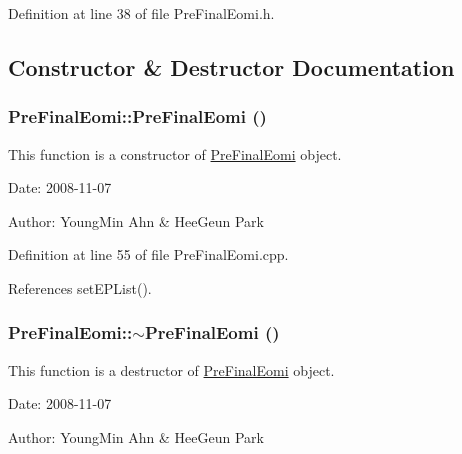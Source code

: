 Definition at line 38 of file PreFinalEomi.h.

\subsection{Constructor \& Destructor Documentation}
\hypertarget{classkmaOrange_1_1PreFinalEomi_de1edac505a8ddb81a6de1b20c6bf338}{
\subsubsection[{PreFinalEomi}]{\setlength{\rightskip}{0pt plus 5cm}PreFinalEomi::PreFinalEomi ()}}
\label{classkmaOrange_1_1PreFinalEomi_de1edac505a8ddb81a6de1b20c6bf338}


This function is a constructor of \hyperlink{classkmaOrange_1_1PreFinalEomi}{PreFinalEomi} object. 

\begin{Desc}
\item[Date:]2008-11-07 \end{Desc}
\begin{Desc}
\item[Author:]YoungMin Ahn \& HeeGeun Park \end{Desc}


Definition at line 55 of file PreFinalEomi.cpp.

References setEPList().\hypertarget{classkmaOrange_1_1PreFinalEomi_1c821b7b617615e3849849509198d98e}{
\subsubsection[{$\sim$PreFinalEomi}]{\setlength{\rightskip}{0pt plus 5cm}PreFinalEomi::$\sim$PreFinalEomi ()}}
\label{classkmaOrange_1_1PreFinalEomi_1c821b7b617615e3849849509198d98e}


This function is a destructor of \hyperlink{classkmaOrange_1_1PreFinalEomi}{PreFinalEomi} object. 

\begin{Desc}
\item[Date:]2008-11-07 \end{Desc}
\begin{Desc}
\item[Author:]YoungMin Ahn \& HeeGeun Park \end{Desc}


